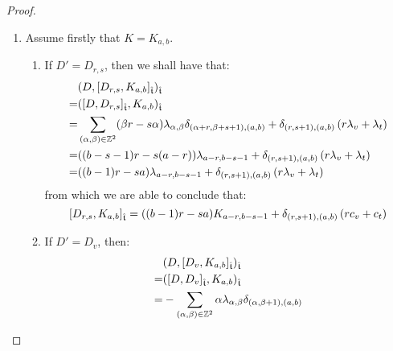\begin{proof}
\begin{enumerate}
                    \item Assume firstly that $K = K_{a, b}$.
                    \begin{enumerate}
                        \item If $D' = D_{r, s}$, then we shall have that:
                            $$
                                \begin{aligned}
                                    & ( D, [D_{r, s}, K_{a, b}]_{\extendedtoroidal} )_{\extendedtoroidal}
                                    \\
                                    = & ( [D, D_{r, s}]_{\extendedtoroidal}, K_{a, b} )_{\extendedtoroidal}
                                    \\
                                    = & \sum_{(\alpha, \beta) \in \Z^2} (\beta r - s \alpha) \lambda_{\alpha, \beta} \delta_{(\alpha + r, \beta + s + 1), (a, b)} + \delta_{(r, s + 1), (a, b)} \left( r\lambda_v + \lambda_t \right)
                                    \\
                                    = & ((b - s - 1) r - s (a - r)) \lambda_{a - r, b - s - 1} + \delta_{(r, s + 1), (a, b)} \left( r\lambda_v + \lambda_t \right)
                                    \\
                                    = & ((b - 1)r - sa) \lambda_{a - r, b - s - 1} + \delta_{(r, s + 1), (a, b)} \left( r\lambda_v + \lambda_t \right)
                                \end{aligned}
                            $$
                        from which we are able to conclude that:
                            $$[D_{r, s}, K_{a, b}]_{\extendedtoroidal} = ((b - 1)r - sa) K_{a - r, b - s - 1} + \delta_{(r, s + 1), (a, b)} \left( r c_v + c_t \right)$$
                        \item If $D' = D_v$, then:
                            $$
                                \begin{aligned}
                                    & ( D, [D_v, K_{a, b}]_{\extendedtoroidal} )_{\extendedtoroidal}
                                    \\
                                    = & ( [D, D_v]_{\extendedtoroidal}, K_{a, b} )_{\extendedtoroidal}
                                    \\
                                    = & -\sum_{(\alpha, \beta) \in \Z^2} \alpha \lambda_{\alpha, \beta} \delta_{(\alpha, \beta + 1), (a, b)} 
                                    \\

\end{aligned}$$
\end{enumerate}
\end{enumerate}
\end{proof}
